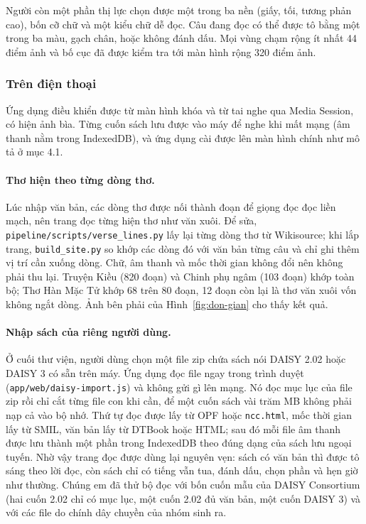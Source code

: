 \documentclass[12pt,a4paper]{article}
\begin{document}
Người còn một phần thị lực chọn được một trong ba nền (giấy, tối, tương phản cao), bốn cỡ chữ và một kiểu chữ dễ đọc. Câu đang đọc có thể được tô bằng một trong ba màu, gạch chân, hoặc không đánh dấu. Mọi vùng chạm rộng ít nhất 44 điểm ảnh và bố cục đã được kiểm tra tới màn hình rộng 320 điểm ảnh.

\subsubsection{Trên điện thoại}

Ứng dụng điều khiển được từ màn hình khóa và từ tai nghe qua Media Session, có hiện ảnh bìa. Từng cuốn sách lưu được vào máy để nghe khi mất mạng (âm thanh nằm trong IndexedDB), và ứng dụng cài được lên màn hình chính như mô tả ở mục 4.1.

\paragraph{Thơ hiện theo từng dòng thơ.} Lúc nhập văn bản, các dòng thơ được nối thành đoạn để giọng đọc đọc liền mạch, nên trang đọc từng hiện thơ như văn xuôi. Để sửa, \texttt{pipeline/scripts/verse\_lines.py} lấy lại từng dòng thơ từ Wikisource; khi lắp trang, \texttt{build\_site.py} so khớp các dòng đó với văn bản từng câu và chỉ ghi thêm vị trí cần xuống dòng. Chữ, âm thanh và mốc thời gian không đổi nên không phải thu lại. Truyện Kiều (820 đoạn) và Chinh phụ ngâm (103 đoạn) khớp toàn bộ; Thơ Hàn Mặc Tử khớp 68 trên 80 đoạn, 12 đoạn còn lại là thơ văn xuôi vốn không ngắt dòng. Ảnh bên phải của Hình~\ref{fig:don-gian} cho thấy kết quả.

\paragraph{Nhập sách của riêng người dùng.} Ở cuối thư viện, người dùng chọn một file zip chứa sách nói DAISY 2.02 hoặc DAISY 3 có sẵn trên máy. Ứng dụng đọc file ngay trong trình duyệt (\texttt{app/web/daisy-import.js}) và không gửi gì lên mạng. Nó đọc mục lục của file zip rồi chỉ cắt từng file con khi cần, để một cuốn sách vài trăm MB không phải nạp cả vào bộ nhớ. Thứ tự đọc được lấy từ OPF hoặc \texttt{ncc.html}, mốc thời gian lấy từ SMIL, văn bản lấy từ DTBook hoặc HTML; sau đó mỗi file âm thanh được lưu thành một phần trong IndexedDB theo đúng dạng của sách lưu ngoại tuyến. Nhờ vậy trang đọc được dùng lại nguyên vẹn: sách có văn bản thì được tô sáng theo lời đọc, còn sách chỉ có tiếng vẫn tua, đánh dấu, chọn phần và hẹn giờ như thường. Chúng em đã thử bộ đọc với bốn cuốn mẫu của DAISY Consortium (hai cuốn 2.02 chỉ có mục lục, một cuốn 2.02 đủ văn bản, một cuốn DAISY 3) và với các file do chính dây chuyền của nhóm sinh ra.
\end{document}
